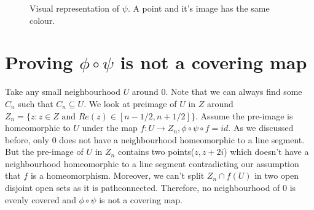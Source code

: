 \documentclass[twocolumn]{article}
\begin{document}
\begin{figure*}
\begin{center}
		
			\end{center}
		\caption{Visual representation of $\psi$. A point and it's image has the same colour.}
\end{figure*} 

\section{Proving $\phi\circ\psi$ is not a covering map}
Take any small neighbourhood $U$ around $0$. Note that we can always find some $C_n$ such that $C_n\subseteq U$. We look at preimage of $U$ in $Z$ around $Z_n=\{z:z\in Z\text{ and }Re(z)\in[n-1/2,n+1/2]\}$.  Assume the pre-image is homeomorphic to $U$ under the map $f:U\to Z_n, \phi\circ\psi\circ f=id$. As we discussed before, only $0$ does not have a neighbourhood homeomorphic to a line segment. But the pre-image of $U$ in $Z_n$ contains two points($z,z+2i$) which doesn't have a neighbourhood homeomorphic to a line segment contradicting our assumption that $f$ is a homeomorphism. Moreover, we can't split $Z_n\cap f(U)$ in two open disjoint open sets as it is pathconnected. Therefore, no neighbourhood of $0$ is evenly covered and $\phi\circ\psi$ is not a covering map.
\end{document}
